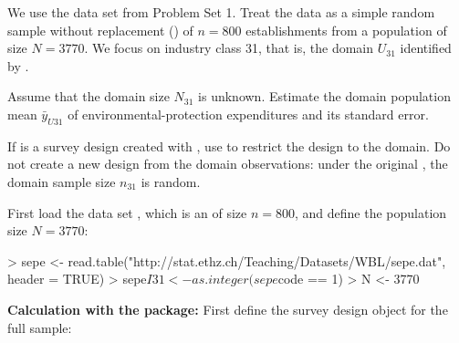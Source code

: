 



\begin{Problem}\label{problem:domain}
    We use the data set  from Problem Set 1. Treat the data
    as a simple random sample without replacement (\SRS) of $n = 800$
    establishments from a population of size $N = 3770$. We focus on industry
    class 31, that is, the domain $U_{31}$ identified by .

\begin{Subtask}
    \item Assume that the domain size $N_{31}$ is unknown. Estimate the domain
        population mean $\bar{y}_{U31}$ of environmental-protection
        expenditures and its standard error.

        \begin{Rhint}
            If  is a survey design created with ,
            use  to restrict the design to the
            domain. Do not create a new \SRS design from the domain
            observations: under the original \SRS, the domain sample size
            $n_{31}$ is random.
        \end{Rhint}

    \begin{Solution}
        First load the data set , which is an \SRS of size
        $n=800$, and define the population size $N=3770$:


\begin{Schunk}
\begin{Sinput}
> sepe <- read.table("http://stat.ethz.ch/Teaching/Datasets/WBL/sepe.dat",
                     header = TRUE)
> sepe$I31 <- as.integer(sepe$code == 1)
> N <- 3770
\end{Sinput}
\end{Schunk}

        \textbf{Calculation with the  package:} First define the
        survey design object for the full sample:

\begin{Schunk}
\end{Schunk}


\end{Solution}
\end{Subtask}
\end{Problem}
